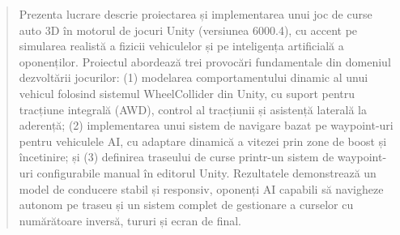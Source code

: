 \begin{abstract}
Prezenta lucrare descrie proiectarea și implementarea unui joc de curse auto 3D în motorul de jocuri Unity (versiunea 6000.4), cu accent pe simularea realistă a fizicii vehiculelor și pe inteligența artificială a oponenților. Proiectul abordează trei provocări fundamentale din domeniul dezvoltării jocurilor: (1) modelarea comportamentului dinamic al unui vehicul folosind sistemul WheelCollider din Unity, cu suport pentru tracțiune integrală (AWD), control al tracțiunii și asistență laterală la aderență; (2) implementarea unui sistem de navigare bazat pe waypoint-uri pentru vehiculele AI, cu adaptare dinamică a vitezei prin zone de boost și încetinire; și (3) definirea traseului de curse printr-un sistem de waypoint-uri configurabile manual în editorul Unity. Rezultatele demonstrează un model de conducere stabil și responsiv, oponenți AI capabili să navigheze autonom pe traseu și un sistem complet de gestionare a curselor cu numărătoare inversă, tururi și ecran de final.
\end{abstract}
